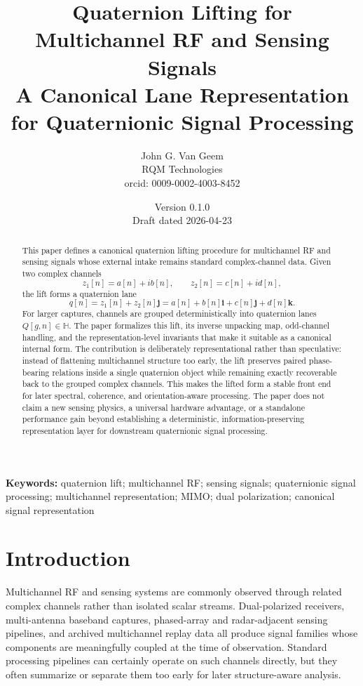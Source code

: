 \documentclass[11pt]{article}
\title{\textbf{Quaternion Lifting for Multichannel RF and Sensing Signals}\\
A Canonical Lane Representation for Quaternionic Signal Processing}
\author{John G. Van Geem\\
RQM Technologies\\
orcid: 0009-0002-4003-8452}
\date{Version 0.1.0 \\ Draft dated 2026-04-23}
\theoremstyle{remark}
\newcommand{\HH}{\mathbb{H}}
\begin{document}
\maketitle

\begin{abstract}
This paper defines a canonical quaternion lifting procedure for multichannel RF and sensing signals whose external intake remains standard complex-channel data. Given two complex channels
\[
z_1[n]=a[n]+ib[n], \qquad z_2[n]=c[n]+id[n],
\]
the lift forms a quaternion lane
\[
q[n]=z_1[n]+z_2[n]\mathbf{j}
     = a[n]+b[n]\mathbf{i}+c[n]\mathbf{j}+d[n]\mathbf{k}.
\]
For larger captures, channels are grouped deterministically into quaternion lanes \(Q[g,n]\in\HH\). The paper formalizes this lift, its inverse unpacking map, odd-channel handling, and the representation-level invariants that make it suitable as a canonical internal form. The contribution is deliberately representational rather than speculative: instead of flattening multichannel structure too early, the lift preserves paired phase-bearing relations inside a single quaternion object while remaining exactly recoverable back to the grouped complex channels. This makes the lifted form a stable front end for later spectral, coherence, and orientation-aware processing. The paper does not claim a new sensing physics, a universal hardware advantage, or a standalone performance gain beyond establishing a deterministic, information-preserving representation layer for downstream quaternionic signal processing.
\end{abstract}

\noindent\textbf{Keywords:} quaternion lift; multichannel RF; sensing signals; quaternionic signal processing; multichannel representation; MIMO; dual polarization; canonical signal representation

\section{Introduction}

Multichannel RF and sensing systems are commonly observed through related complex channels rather than isolated scalar streams. Dual-polarized receivers, multi-antenna baseband captures, phased-array and radar-adjacent sensing pipelines, and archived multichannel replay data all produce signal families whose components are meaningfully coupled at the time of observation. Standard processing pipelines can certainly operate on such channels directly, but they often summarize or separate them too early for later structure-aware analysis.
\end{document}
